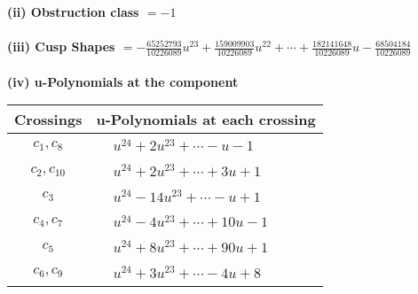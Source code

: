 \documentclass[1p]{elsarticle_modified}
\theoremstyle{definition}
\begin{document}
\flushleft \textbf{(ii) Obstruction class $= -1$}\\~\\
\flushleft \textbf{(iii) Cusp Shapes $= -\frac{65252793}{10226089} u^{23}+\frac{159009903}{10226089} u^{22}+\cdots+\frac{182141648}{10226089} u-\frac{68504184}{10226089}$}\\~\\
\newpage\renewcommand{\arraystretch}{1}
\flushleft \textbf{(iv) u-Polynomials at the component}\newline \\
\begin{tabular}{m{50pt}|m{274pt}}
Crossings & \hspace{64pt}u-Polynomials at each crossing \\
\hline $$\begin{aligned}c_{1},c_{8}\end{aligned}$$&$\begin{aligned}
&u^{24}+2 u^{23}+\cdots- u-1
\end{aligned}$\\
\hline $$\begin{aligned}c_{2},c_{10}\end{aligned}$$&$\begin{aligned}
&u^{24}+2 u^{23}+\cdots+3 u+1
\end{aligned}$\\
\hline $$\begin{aligned}c_{3}\end{aligned}$$&$\begin{aligned}
&u^{24}-14 u^{23}+\cdots- u+1
\end{aligned}$\\
\hline $$\begin{aligned}c_{4},c_{7}\end{aligned}$$&$\begin{aligned}
&u^{24}-4 u^{23}+\cdots+10 u-1
\end{aligned}$\\
\hline $$\begin{aligned}c_{5}\end{aligned}$$&$\begin{aligned}
&u^{24}+8 u^{23}+\cdots+90 u+1
\end{aligned}$\\
\hline $$\begin{aligned}c_{6},c_{9}\end{aligned}$$&$\begin{aligned}
&u^{24}+3 u^{23}+\cdots-4 u+8
\end{aligned}$\\
\hline
\end{tabular}\\~\\
\end{document}
